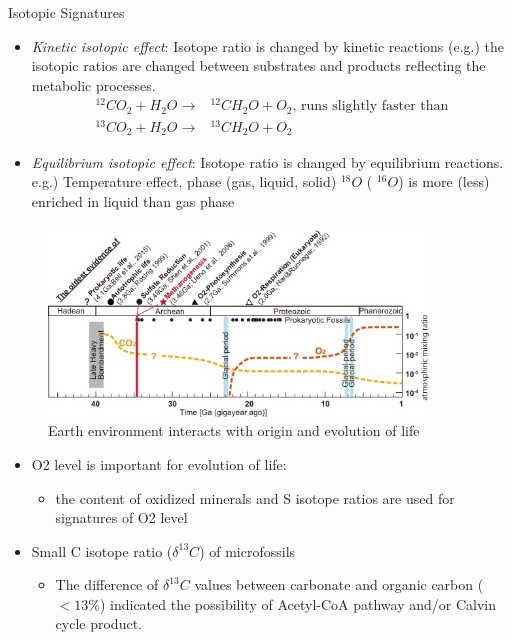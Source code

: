 \documentclass[]{article}
\begin{document}
Isotopic Signatures

\begin{itemize}
	\item \textit{Kinetic isotopic effect}:
	Isotope ratio is changed by kinetic reactions 	(e.g.) the isotopic ratios are changed between substrates and products reflecting the metabolic processes. \begin{align*}
	^{12}CO_2 + H_2O \rightarrow&^{12}CH_2O + O_2 \text{, runs slightly faster than}\\
	^{13}CO_2 + H_2O \rightarrow&^{13}CH_2O + O_2 
	\end{align*}
	\item \textit{Equilibrium isotopic effect}:
	Isotope ratio is changed by equilibrium reactions.
	e.g.) Temperature effect, phase (gas, liquid, solid)
	$^{18}O$ ( $^{16}O$) is more (less) enriched in liquid than gas phase
\end{itemize}

\begin{figure}[H]
	\caption{Earth environment interacts with origin and evolution of life}\label{fig:Timeline}
	\includegraphics[width=0.9\textwidth]{Timeline}
\end{figure}

\begin{itemize}
	\item O2 level is important for evolution of life:
	\begin{itemize}
		\item the content of oxidized minerals and S isotope ratios are used for
		signatures of O2 level
	\end{itemize}
	\item  Small C isotope ratio ($\delta^{13}C$) of microfossils
	\begin{itemize}
		\item 	The difference of $\delta^{13}C$ values between carbonate and organic carbon ($<13\%$) indicated the possibility of Acetyl-CoA pathway
		and/or Calvin cycle product.
	\end{itemize}
\end{itemize}
\end{document}
